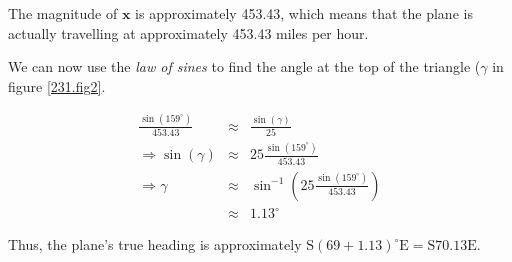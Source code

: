 The magnitude of $\mathbf{x}$ is approximately 453.43, which means that the plane is actually travelling at approximately 453.43 miles per hour.

We can now use the \emph{law of sines} to find the angle at the top of the triangle ($\gamma$ in figure \vref{231.fig2}.

\begin{eqnarray*}
	\frac{\sin\left(159^\circ\right)}{453.43}&\approx&\frac{\sin\left(\gamma\right)}{25}\\
	\Rightarrow\sin\left(\gamma\right)&\approx&25\frac{\sin\left(159^\circ\right)}{453.43}\\
	\Rightarrow\gamma&\approx&\sin^{-1}\left(25\frac{\sin\left(159^\circ\right)}{453.43}\right)\\
	&\approx&1.13^\circ
\end{eqnarray*}

Thus, the plane's true heading is approximately $\mbox{S}\left(69+1.13\right)^\circ\mbox{E}=\mbox{S}70.13\mbox{E}$.
